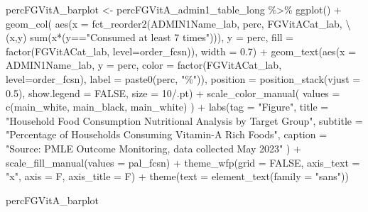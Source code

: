 \documentclass[
  letterpaper,
  DIV=11,
  numbers=noendperiod]{scrreprt}
\newenvironment{Shaded}{\begin{snugshade}}{\end{snugshade}}
\newcommand{\AttributeTok}[1]{\textcolor[rgb]{0.40,0.45,0.13}{#1}}
\newcommand{\ConstantTok}[1]{\textcolor[rgb]{0.56,0.35,0.01}{#1}}
\newcommand{\DecValTok}[1]{\textcolor[rgb]{0.68,0.00,0.00}{#1}}
\newcommand{\FloatTok}[1]{\textcolor[rgb]{0.68,0.00,0.00}{#1}}
\newcommand{\FunctionTok}[1]{\textcolor[rgb]{0.28,0.35,0.67}{#1}}
\newcommand{\NormalTok}[1]{\textcolor[rgb]{0.00,0.23,0.31}{#1}}
\newcommand{\OtherTok}[1]{\textcolor[rgb]{0.00,0.23,0.31}{#1}}
\newcommand{\SpecialCharTok}[1]{\textcolor[rgb]{0.37,0.37,0.37}{#1}}
\newcommand{\StringTok}[1]{\textcolor[rgb]{0.13,0.47,0.30}{#1}}
\begin{document}
\begin{Shaded}
\begin{Highlighting}[]
\NormalTok{percFGVitA\_barplot }\OtherTok{\textless{}{-}}\NormalTok{ percFGVitA\_admin1\_table\_long }\SpecialCharTok{\%\textgreater{}\%} 
  \FunctionTok{ggplot}\NormalTok{() }\SpecialCharTok{+}
  \FunctionTok{geom\_col}\NormalTok{(}
    \FunctionTok{aes}\NormalTok{(}\AttributeTok{x =} \FunctionTok{fct\_reorder2}\NormalTok{(ADMIN1Name\_lab,}
\NormalTok{                         perc,  }
\NormalTok{                         FGVitACat\_lab,}
\NormalTok{                         \textbackslash{}(x,y) }\FunctionTok{sum}\NormalTok{(x}\SpecialCharTok{*}\NormalTok{(y}\SpecialCharTok{==}\StringTok{"Consumed at least 7 times"}\NormalTok{))), }
        \AttributeTok{y =}\NormalTok{ perc,}
        \AttributeTok{fill =} \FunctionTok{factor}\NormalTok{(FGVitACat\_lab, }\AttributeTok{level=}\NormalTok{order\_fcsn)), }
    \AttributeTok{width =} \FloatTok{0.7}\NormalTok{) }\SpecialCharTok{+}
  \FunctionTok{geom\_text}\NormalTok{(}\FunctionTok{aes}\NormalTok{(}\AttributeTok{x =}\NormalTok{ ADMIN1Name\_lab,}
                \AttributeTok{y =}\NormalTok{ perc,}
                \AttributeTok{color =} \FunctionTok{factor}\NormalTok{(FGVitACat\_lab, }\AttributeTok{level=}\NormalTok{order\_fcsn),}
                \AttributeTok{label =} \FunctionTok{paste0}\NormalTok{(perc, }\StringTok{"\%"}\NormalTok{)),}
            \AttributeTok{position =} \FunctionTok{position\_stack}\NormalTok{(}\AttributeTok{vjust =} \FloatTok{0.5}\NormalTok{),}
            \AttributeTok{show.legend =} \ConstantTok{FALSE}\NormalTok{,}
            \AttributeTok{size =} \DecValTok{10}\SpecialCharTok{/}\NormalTok{.pt) }\SpecialCharTok{+}
  \FunctionTok{scale\_color\_manual}\NormalTok{(}
    \AttributeTok{values =} \FunctionTok{c}\NormalTok{(main\_white, main\_black, main\_white)}
\NormalTok{  ) }\SpecialCharTok{+}
  \FunctionTok{labs}\NormalTok{(}\AttributeTok{tag =} \StringTok{"Figure"}\NormalTok{,}
       \AttributeTok{title =} \StringTok{"Household Food Consumption Nutritional Analysis by Target Group"}\NormalTok{,}
       \AttributeTok{subtitle =} \StringTok{"Percentage of Households Consuming Vitamin{-}A Rich Foods"}\NormalTok{,}
       \AttributeTok{caption =} \StringTok{"Source: PMLE Outcome Monitoring, data collected May 2023"}
\NormalTok{  ) }\SpecialCharTok{+}  \FunctionTok{scale\_fill\_manual}\NormalTok{(}\AttributeTok{values =}\NormalTok{ pal\_fcsn) }\SpecialCharTok{+} \FunctionTok{theme\_wfp}\NormalTok{(}\AttributeTok{grid =} \ConstantTok{FALSE}\NormalTok{, }\AttributeTok{axis\_text =} \StringTok{"x"}\NormalTok{, }\AttributeTok{axis =}\NormalTok{ F, }\AttributeTok{axis\_title =}\NormalTok{ F) }\SpecialCharTok{+} \FunctionTok{theme}\NormalTok{(}\AttributeTok{text =} \FunctionTok{element\_text}\NormalTok{(}\AttributeTok{family =} \StringTok{"sans"}\NormalTok{))}

\NormalTok{percFGVitA\_barplot}
\end{Highlighting}
\end{Shaded}
\end{document}
